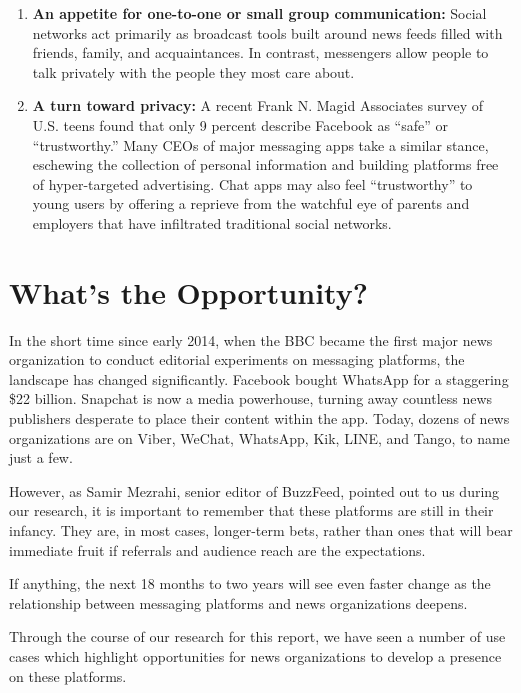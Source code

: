 \documentclass[notoc, symmetric, nobib, nols]{towcenter-guideto-book}
\begin{document}
\begin{enumerate}[itemsep=1em]
\item\textbf{An appetite for one-to-one or small group communication:} Social networks act primarily as broadcast tools built around news feeds filled with friends, family, and acquaintances. In contrast, messengers allow people to talk privately with the people they most care about. 

\item\textbf{A turn toward privacy:} A recent Frank N. Magid Associates survey of U.S. teens found that only 9 percent describe Facebook as ``safe'' or ``trustworthy.''\autocite{MagidStudy} Many CEOs of major messaging apps take a similar stance, eschewing the collection of personal information and building platforms free of hyper-targeted advertising. Chat apps may also feel ``trustworthy'' to young users by offering a reprieve from the watchful eye of parents and employers that have infiltrated traditional social networks.
\end{enumerate}
 
\section{What's the Opportunity?}

In the short time since early 2014, when the BBC became the first major news organization to conduct editorial experiments on messaging platforms, the landscape has changed significantly. Facebook bought WhatsApp for a staggering \$22 billion. Snapchat is now a media powerhouse, turning away countless news publishers desperate to place their content within the app. Today, dozens of news organizations are on Viber, WeChat, WhatsApp, Kik, LINE, and Tango, to name just a few.

However, as Samir Mezrahi, senior editor of BuzzFeed, pointed out to us during our research, it is important to remember that these platforms are still in their infancy. They are, in most cases, longer-term bets, rather than ones that will bear immediate fruit if referrals and audience reach are the expectations. 

If anything, the next 18 months to two years will see even faster change as the relationship between messaging platforms and news organizations deepens. 

Through the course of our research for this report, we have seen a number of use cases which highlight opportunities for news organizations to develop a presence on these platforms.
\end{document}
